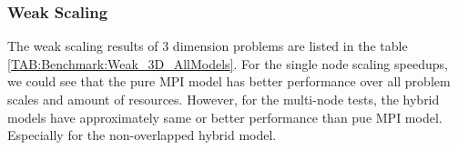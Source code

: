 \subsubsection{Weak Scaling}

The weak scaling results of 3 dimension problems are listed in the table \ref{TAB:Benchmark:Weak_3D_AllModels}.
For the single node scaling speedups, we could see that the pure MPI model has better performance over all problem scales 
and amount of resources.
However, for the multi-node tests, the hybrid models have approximately same or better performance than pue MPI model.
Especially for the non-overlapped hybrid model.





